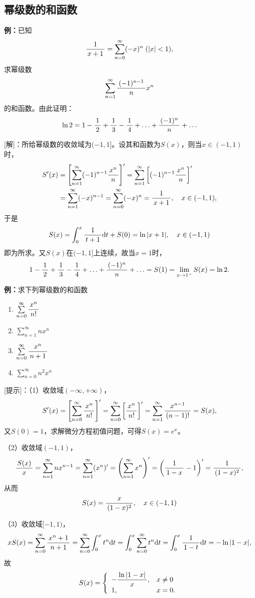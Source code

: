 \subsection{幂级数的和函数}

{\bf 例：}已知
$$\displaystyle\frac{\,{1}\,}{\,{x+1}\,}=\sum\limits_{n=0}^{\infty}(-x)^n\;(|x|<1),$$
求幂级数
$$\sum\limits_{n=1}^{\infty}\displaystyle\frac{\,{(-1)^{n-1}}\,}{\,{n}\,}x^n$$
的和函数。由此证明：
$$\ln 2=1-\displaystyle\frac{\,{1}\,}{\,{2}\,}+\displaystyle\frac{\,{1}\,}{\,{3}\,}-\displaystyle\frac{\,{1}\,}{\,{4}\,}+\ldots+\displaystyle\frac{\,{(-1)^n}\,}{\,{n}\,}+\ldots$$

[解]：所给幂级数的收敛域为$(-1,1]$。设其和函数为$S(x)$，则当$x\in(-1,1)$时，
\begin{align*}
	S'(x)&=\left[\sum\limits_{n=1}^{\infty}(-1)^{n-1}\displaystyle\frac{\,{x^n}\,}{\,{n}\,}\right]'
	=\sum\limits_{n=1}^{\infty}\left[(-1)^{n-1}\displaystyle\frac{\,{x^n}\,}{\,{n}\,}\right]'\\
	&=\sum\limits_{n=1}^{\infty}(-x)^{n-1}
	=\sum\limits_{n=0}^{\infty}(-x)^{n}=\displaystyle\frac{\,{1}\,}{\,{x+1}\,},\quad x\in(-1,1),
\end{align*}
于是
$$S(x)=\displaystyle\int_0^x\displaystyle\frac{\,{1}\,}{\,{t+1}\,}\mathrm{d} t+S(0)=\ln|x+1|, \quad x\in(-1,1)$$
即为所求。又$S(x)$在$(-1,1]$上连续，故当$x=1$时，
$$1-\displaystyle\frac{\,{1}\,}{\,{2}\,}+\displaystyle\frac{\,{1}\,}{\,{3}\,}-\displaystyle\frac{\,{1}\,}{\,{4}\,}+\ldots+\displaystyle\frac{\,{(-1)^n}\,}{\,{n}\,}+\ldots
=S(1)=\lim\limits_{x\to{1^-}}S(x)=\ln 2.$$
\fin

{\bf 例：}求下列幂级数的和函数
\begin{enumerate}[(1)]
  \setlength{\itemindent}{1cm}
  \item $\sum\limits_{n=0}^{\infty}\displaystyle\frac{\,{x^n}\,}{\,{n!}\,}$
  \item $\sum\limits_{n=1}^{\infty}nx^n$
  \item $\sum\limits_{n=0}^{\infty}\displaystyle\frac{\,{x^n}\,}{\,{n+1}\,}$
  \item $\sum\limits_{n=0}^{\infty}n^2x^n$
\end{enumerate}

[提示]：（1）收敛域$(-\infty,+\infty)$，
$$S'(x)=\left[\sum\limits_{n=0}^{\infty}\displaystyle\frac{\,{x^n}\,}{\,{n!}\,}\right]'
=\sum\limits_{n=0}^{\infty}\left[\displaystyle\frac{\,{x^n}\,}{\,{n!}\,}\right]'
=\sum\limits_{n=1}^{\infty}\displaystyle\frac{\,{x^{n-1}}\,}{\,{(n-1)!}\,}=S(x),$$
又$S(0)=1$，求解微分方程初值问题，可得$S(x)=e^x$。

（2）收敛域$(-1,1)$，
$$
	\displaystyle\frac{\,{S(x)}\,}{\,{x}\,}=\sum\limits_{n=1}^{\infty}nx^{n-1}
	=\sum\limits_{n=1}^{\infty}(x^{n})'
	=\left(\sum\limits_{n=1}^{\infty}x^{n}\right)'
	=\left(\displaystyle\frac{\,{1}\,}{\,{1-x}\,}-1\right)'=\displaystyle\frac{\,{1}\,}{\,{(1-x)^2}\,},
$$
从而
$$S(x)=\displaystyle\frac{\,{x}\,}{\,{(1-x)^2}\,},\quad x\in(-1,1)$$

（3）收敛域$[-1,1)$，
$$
xS(x)=\sum\limits_{n=0}^{\infty}\displaystyle\frac{\,{x^n+1}\,}{\,{n+1}\,}
=\sum\limits_{n=0}^{\infty}\displaystyle\int_0^x t^n\mathrm{d} t
=\displaystyle\int_0^x \sum\limits_{n=0}^{\infty}t^n\mathrm{d} t
=\displaystyle\int_0^x \displaystyle\frac{\,{1}\,}{\,{1-t}\,}\mathrm{d} t=-\ln|1-x|,
$$
故
$$S(x)=\left\{\begin{array}{ll}
	-\displaystyle\frac{\,{\ln|1-x|}\,}{\,{x}\,},&x\ne0\\
	1,&x=0.
\end{array}\right.$$
\fin

